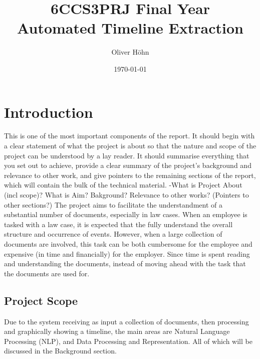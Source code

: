 \documentclass[11pt]{informatics-report}
\title{6CCS3PRJ Final Year\\\vspace{0.2cm}Automated Timeline Extraction}
\author{Oliver H\"ohn}
\date{\today}
\begin{document}
\createFrontMatter
\onehalfspacing
\tableofcontents
\doublespacing


\chapter{Introduction}
This is one of the most important components of the report. It should begin with a clear statement of what the project is about so that the nature and scope of the project can be understood by a lay reader. It should summarise everything that you set out to achieve, provide a clear summary of the project's background and relevance to other work, and give pointers to the remaining sections of the report, which will contain the bulk of the technical material.
-What is Project About (incl scope)? What is Aim? Bakground? Relevance to other works? (Pointers to other sections?)
The project aims to facilitate the understandment of a substantial number of documents, especially in law cases. When an employee is tasked with a law case, it is expected that the fully understand the overall structure and occurrence of events. However, when a large collection of documents are involved, this task can be both cumbersome for the employee and expensive (in time and financially) for the employer. Since time is spent reading and understanding the documents, instead of moving ahead with the task that the documents are used for.
\section{Project Scope}
Due to the system receiving as input a collection of documents, then processing and graphically showing a timeline, the main areas are Natural Language Processing (NLP), and Data Processing and Representation. All of which will be discussed in the Background section.
\end{document}
